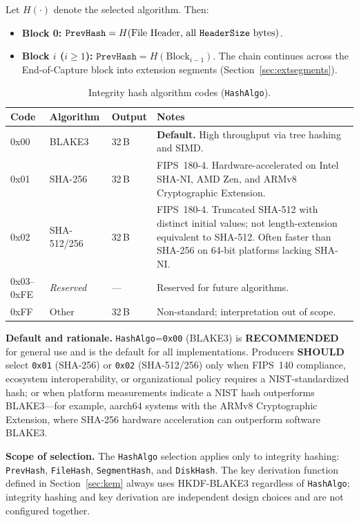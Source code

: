 \documentclass[11pt,a4paper]{article}
\newcommand{\SHOULD}{\textbf{SHOULD}}
\newcommand{\hex}[1]{\texttt{0x#1}}
\newcommand{\field}[1]{\texttt{#1}}
\begin{document}
Let $H(\cdot)$ denote the selected algorithm. Then:
\begin{itemize}[leftmargin=1.5em, itemsep=2pt]
\item \textbf{Block 0:} $\field{PrevHash} = H(\text{File Header, all \field{HeaderSize} bytes})$.
\item \textbf{Block $i$ ($i\geq 1$):} $\field{PrevHash} = H(\text{Block}_{i-1})$. The chain continues across the End-of-Capture block into extension segments (Section~\ref{sec:extsegments}).
\end{itemize}

\begin{table}[H]\centering\caption{Integrity hash algorithm codes (\field{HashAlgo}).}\label{tab:hashalgos}\small
\begin{tabular}{M l l p{6cm}}\toprule\textbf{Code}&\textbf{Algorithm}&\textbf{Output}&\textbf{Notes}\\\midrule
0x00 & BLAKE3~\cite{blake3} & 32\,B & \textbf{Default.} High throughput via tree hashing and SIMD. \\
0x01 & SHA-256~\cite{fips180} & 32\,B & FIPS~180-4. Hardware-accelerated on Intel SHA-NI, AMD Zen, and ARMv8 Cryptographic Extension. \\
0x02 & SHA-512/256~\cite{fips180} & 32\,B & FIPS~180-4. Truncated SHA-512 with distinct initial values; not length-extension equivalent to SHA-512. Often faster than SHA-256 on 64-bit platforms lacking SHA-NI. \\
0x03--0xFE & \textit{Reserved} & --- & Reserved for future algorithms. \\
0xFF & Other & 32\,B & Non-standard; interpretation out of scope. \\\bottomrule
\end{tabular}\end{table}

\noindent\textbf{Default and rationale.} \field{HashAlgo}=\hex{00} (BLAKE3) is \textbf{RECOMMENDED} for general use and is the default for all implementations. Producers \SHOULD{} select \hex{01} (SHA-256) or \hex{02} (SHA-512/256) only when FIPS~140 compliance, ecosystem interoperability, or organizational policy requires a NIST-standardized hash; or when platform measurements indicate a NIST hash outperforms BLAKE3---for example, aarch64 systems with the ARMv8 Cryptographic Extension, where SHA-256 hardware acceleration can outperform software BLAKE3.

\noindent\textbf{Scope of selection.} The \field{HashAlgo} selection applies only to integrity hashing: \field{PrevHash}, \field{FileHash}, \field{SegmentHash}, and \field{DiskHash}. The key derivation function defined in Section~\ref{sec:kem} always uses HKDF-BLAKE3 regardless of \field{HashAlgo}; integrity hashing and key derivation are independent design choices and are not configured together.
\end{document}
